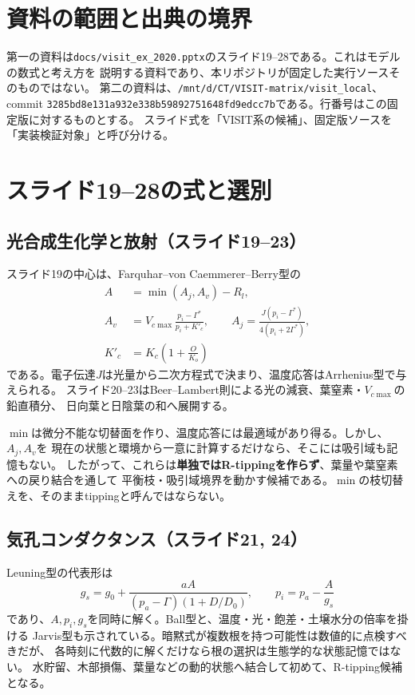 \documentclass[a4paper,11pt]{ltjsarticle}
\newcommand{\code}[1]{\nolinkurl{#1}}
\begin{document}
\section{資料の範囲と出典の境界}
第一の資料は\code{docs/visit_ex_2020.pptx}のスライド19--28である。これはモデルの数式と考え方を
説明する資料であり、本リポジトリが固定した実行ソースそのものではない。
第二の資料は、\code{/mnt/d/CT/VISIT-matrix/visit_local}、commit
\code{3285bd8e131a932e338b59892751648fd9edcc7b}である。行番号はこの固定版に対するものとする。
スライド式を「VISIT系の候補」、固定版ソースを「実装検証対象」と呼び分ける。

\section{スライド19--28の式と選別}
\subsection{光合成生化学と放射（スライド19--23）}
スライド19の中心は、Farquhar--von Caemmerer--Berry型の
\begin{align}
 A&=\min(A_j,A_v)-R_l,\\
 A_v&=V_{c\max}\frac{p_i-\Gamma^*}{p_i+K'_c},\qquad
 A_j=\frac{J(p_i-\Gamma^*)}{4(p_i+2\Gamma^*)},\\
 K'_c&=K_c\left(1+\frac{O}{K_o}\right)
\end{align}
である。電子伝達$J$は光量から二次方程式で決まり、温度応答はArrhenius型で与えられる。
スライド20--23はBeer--Lambert則による光の減衰、葉窒素・$V_{c\max}$の鉛直積分、
日向葉と日陰葉の和へ展開する。

$\min$は微分不能な切替面を作り、温度応答には最適域があり得る。しかし、$A_j,A_v$を
現在の状態と環境から一意に計算するだけなら、そこには吸引域も記憶もない。
したがって、これらは\textbf{単独ではR-tippingを作らず}、葉量や葉窒素への戻り結合を通して
平衡枝・吸引域境界を動かす候補である。$\min$の枝切替えを、そのままtippingと呼んではならない。

\subsection{気孔コンダクタンス（スライド21, 24）}
Leuning型の代表形は
\begin{equation}
 g_s=g_0+\frac{aA}{(p_a-\Gamma)(1+D/D_0)},\qquad
 p_i=p_a-\frac{A}{g_s}
\end{equation}
であり、$A,p_i,g_s$を同時に解く。Ball型と、温度・光・飽差・土壌水分の倍率を掛ける
Jarvis型も示されている。暗黙式が複数根を持つ可能性は数値的に点検すべきだが、
各時刻に代数的に解くだけなら根の選択は生態学的な状態記憶ではない。
水貯留、木部損傷、葉量などの動的状態へ結合して初めて、R-tipping候補となる。
\end{document}
